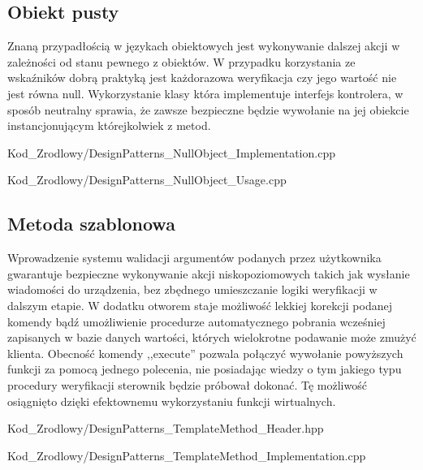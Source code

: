     \subsection{Obiekt pusty}
        Znaną przypadłością w językach obiektowych jest wykonywanie dalszej akcji w zależności od stanu pewnego z obiektów.
        W przypadku korzystania ze wskaźników dobrą praktyką jest każdorazowa weryfikacja czy jego wartość nie jest równa null.
        Wykorzystanie klasy która implementuje interfejs kontrolera, w sposób neutralny sprawia, że zawsze bezpieczne będzie wywołanie na jej obiekcie 
        instancjonującym którejkolwiek z metod.
        
            {Kod_Zrodlowy/DesignPatterns_NullObject_Implementation.cpp}
        
            {Kod_Zrodlowy/DesignPatterns_NullObject_Usage.cpp}
    \newpage
    \subsection{Metoda szablonowa}
        Wprowadzenie systemu walidacji argumentów podanych przez użytkownika gwarantuje bezpieczne wykonywanie akcji niskopoziomowych takich
        jak wysłanie wiadomości do urządzenia, bez zbędnego umieszczanie logiki weryfikacji w dalszym etapie. W dodatku otworem staje
        możliwość lekkiej korekcji podanej komendy bądź umożliwienie procedurze automatycznego pobrania wcześniej zapisanych w bazie danych wartości,
        których wielokrotne podawanie może zmużyć klienta. Obecność komendy ,,execute'' pozwala połączyć wywołanie powyższych funkcji za pomocą jednego polecenia,
        nie posiadając wiedzy o tym jakiego typu procedury weryfikacji sterownik będzie próbował dokonać. Tę możliwość osiągnięto dzięki efektownemu wykorzystaniu
        funkcji wirtualnych.
        
            {Kod_Zrodlowy/DesignPatterns_TemplateMethod_Header.hpp}
        
            {Kod_Zrodlowy/DesignPatterns_TemplateMethod_Implementation.cpp}
